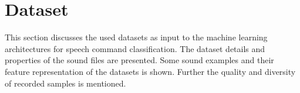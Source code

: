 
\section{Dataset}
This section discusses the used datasets as input to the machine learning architectures for speech command classification.
The dataset details and properties of the sound files are presented.
Some sound examples and their feature representation of the datasets is shown.
Further the quality and diversity of recorded samples is mentioned.

